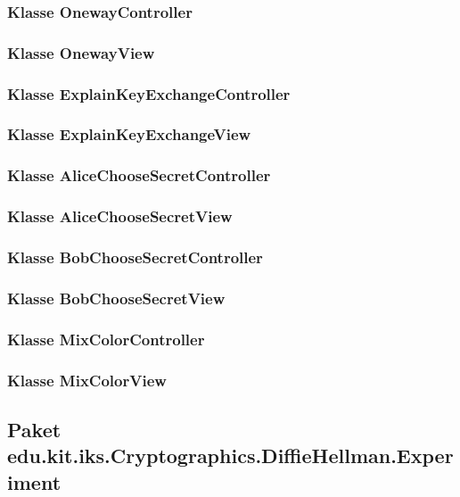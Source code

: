 \documentclass{article}
\begin{document}
	\subsubsection{Klasse OnewayController}

	\subsubsection{Klasse OnewayView}

	\subsubsection{Klasse ExplainKeyExchangeController}

	\subsubsection{Klasse ExplainKeyExchangeView}

	\subsubsection{Klasse AliceChooseSecretController}

	\subsubsection{Klasse AliceChooseSecretView}

	\subsubsection{Klasse BobChooseSecretController}

	\subsubsection{Klasse BobChooseSecretView}

	\subsubsection{Klasse MixColorController}

	\subsubsection{Klasse MixColorView}

  \subsection{Paket edu.kit.iks.Cryptographics.DiffieHellman.Experiment}
\end{document}
